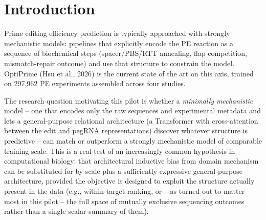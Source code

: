 \documentclass[11pt]{article}
\begin{document}
\begin{abstract}
We also report, and retract, an earlier result. Before the authors' data was
available we reconstructed the corpus from public sources and measured an
apparently decisive margin over OptiPrime ($+0.070$ to $+0.083$ Spearman,
$p<0.0005$). That margin was an artifact: lacking upstream genomic context for
part of the corpus, we had left-padded sequences with filler bases before running
OptiPrime, degrading its inputs. On correctly formatted data OptiPrime's Liu-only
score rises to $0.8365$ from $0.724$, and the margin disappears. We document the
reconstruction effort, the artifact, and the corrected conclusion in full, since
the failure mode -- a baseline handicapped by input preprocessing rather than by
modelling -- is easy to reproduce and hard to detect from aggregate metrics alone.
\end{abstract}

\tableofcontents

\section{Introduction}

Prime editing efficiency prediction is typically approached with strongly
mechanistic models: pipelines that explicitly encode the PE reaction as a
sequence of biochemical steps (spacer/PBS/RTT annealing, flap competition,
mismatch-repair outcome) and use that structure to constrain the model. OptiPrime
(Hsu et al., 2026) is the current state of the art on this axis, trained on
297{,}962 PE experiments assembled across four studies.

The research question motivating this pilot is whether a \emph{minimally
mechanistic} model -- one that encodes only the raw sequences and experimental
metadata and lets a general-purpose relational architecture (a Transformer with
cross-attention between the edit and pegRNA representations) discover whatever
structure is predictive -- can match or outperform a strongly mechanistic model
of comparable training scale. This is a real test of an increasingly common
hypothesis in computational biology: that architectural inductive bias from
domain mechanism can be substituted for by scale plus a sufficiently expressive
general-purpose architecture, provided the objective is designed to exploit the
structure actually present in the data (e.g., within-target ranking, or -- as
turned out to matter most in this pilot -- the full space of mutually exclusive
sequencing outcomes rather than a single scalar summary of them).
\end{document}
